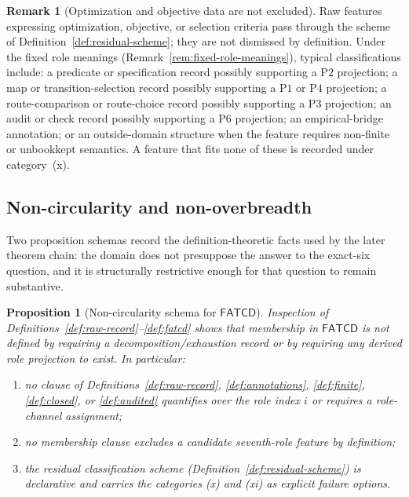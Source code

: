\documentclass[11pt]{article}
\newtheorem{proposition}[theorem]{Proposition}
\theoremstyle{definition}
\newtheorem{remark}[theorem]{Remark}
\newcommand{\FATCD}{\ensuremath{\mathsf{FATCD}}}
\newcommand{\Pone}{\ensuremath{\mathrm{P1}}}
\newcommand{\Ptwo}{\ensuremath{\mathrm{P2}}}
\newcommand{\Pthree}{\ensuremath{\mathrm{P3}}}
\newcommand{\Pfour}{\ensuremath{\mathrm{P4}}}
\newcommand{\Psix}{\ensuremath{\mathrm{P6}}}
\begin{document}
\begin{remark}[Optimization and objective data are not excluded]\label{rem:optimization-not-excluded}
Raw features expressing optimization, objective, or selection criteria
pass through the scheme of Definition~\ref{def:residual-scheme}; they
are not dismissed by definition. Under the fixed role meanings
(Remark~\ref{rem:fixed-role-meanings}), typical classifications
include: a predicate or specification record possibly supporting a
\Ptwo{} projection; a map or transition-selection record possibly
supporting a \Pone{} or \Pfour{} projection; a route-comparison or
route-choice record possibly supporting a \Pthree{} projection; an
audit or check record possibly supporting a \Psix{} projection; an
empirical-bridge annotation; or an outside-domain structure when the
feature requires non-finite or unbookkept semantics. A feature that
fits none of these is recorded under category~(x).
\end{remark}

\subsection{Non-circularity and non-overbreadth}\label{subsec:non-circularity-non-overbreadth}

Two proposition schemas record the definition-theoretic facts used by
the later theorem chain: the domain does not presuppose the answer to
the exact-six question, and it is structurally restrictive enough
for that question to remain substantive.

\begin{proposition}[Non-circularity schema for \FATCD{}]\label{prop:non-circularity}
Inspection of Definitions~\ref{def:raw-record}--\ref{def:fatcd} shows that
membership in \FATCD{} is not defined by requiring a decomposition/exhaustion record or
by requiring any derived role projection to exist. In particular:
\begin{enumerate}[label=(\roman*),topsep=2pt,itemsep=1pt]
  \item no clause of Definitions~\ref{def:raw-record},
    \ref{def:annotations}, \ref{def:finite}, \ref{def:closed}, or
    \ref{def:audited} quantifies over the role index \(i\) or requires a
    role-channel assignment;
  \item no membership clause excludes a candidate seventh-role feature by
    definition;
  \item the residual classification scheme (Definition~\ref{def:residual-scheme})
    is declarative and carries the categories (x) and (xi) as explicit
    failure options.
\end{enumerate}
\end{proposition}
\end{document}
